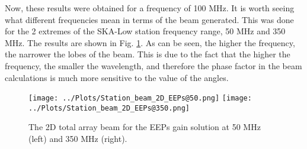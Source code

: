 \documentclass[12pt]{report} %
\begin{document}
Now, these results were obtained for a frequency of 100 MHz. It is worth seeing what different frequencies mean in terms of the beam generated. This was done for the 2 extremes of the SKA-Low station frequency range, 50 MHz and 350 MHz. The results are shown in Fig. \ref{fig:2D_beam_freqs}. As can be seen, the higher the frequency, the narrower the lobes of the beam. This is due to the fact that the higher the frequency, the smaller the wavelength, and therefore the phase factor in the beam calculations is much more sensitive to the value of the angles.

\begin{figure}[h]
    \centering
    \texttt{[image: ../Plots/Station\_beam\_2D\_EEPs@50.png]}
    \texttt{[image: ../Plots/Station\_beam\_2D\_EEPs@350.png]}
    \caption{The 2D total array beam for the EEPs gain solution at 50 MHz (left) and 350 MHz (right).}
    \label{fig:2D_beam_freqs}
\end{figure}



\end{document}

